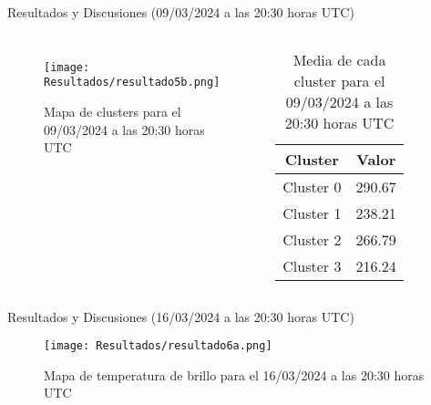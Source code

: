 \documentclass[aspectratio=169,xcolor=dvipsnames]{beamer}
\begin{document}
\begin{frame}{Resultados y Discusiones (09/03/2024 a las 20:30 horas UTC)}
    \begin{columns}

        \begin{figure}
            \centering
            \texttt{[image: Resultados/resultado5b.png]}
            {\footnotesize %
            \caption{Mapa de clusters para el 09/03/2024 a las 20:30 horas UTC}
            \label{fig17}
            }
        \end{figure}

        \centering
        \begin{table}[h!]
            \centering
            {\footnotesize %
            \begin{tabular}{|c|c|}
                \hline
                \textbf{Cluster} & \textbf{Valor} \\
                \hline
                Cluster 0 & 290.67 \\
                Cluster 1 & 238.21 \\
                Cluster 2 & 266.79 \\
                Cluster 3 & 216.24 \\                
                \hline
            \end{tabular}
            \caption{Media de cada cluster para el 09/03/2024 a las 20:30 horas UTC}
            }
        \end{table}

    \end{columns}
\end{frame}
\begin{frame}{Resultados y Discusiones (16/03/2024 a las 20:30 horas UTC)}
\begin{figure}
    \centering
    \texttt{[image: Resultados/resultado6a.png]}
    \caption{Mapa de temperatura de brillo para el 16/03/2024 a las 20:30 horas UTC}
    \label{fig18}
\end{figure}
\end{frame}
\end{document}
